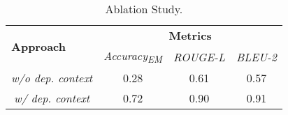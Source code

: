 \begin{table}[]
\centering
\begin{tabular}{l|ccc}
\toprule
\multirow{2}{*}{\textbf{Approach}} & \multicolumn{3}{c}{\textbf{Metrics}}                                  \\ \cline{2-4} 
                                   & \multicolumn{1}{c|}{\textit{Accuracy\textsubscript{EM}}} & \multicolumn{1}{c|}{\textit{ROUGE-L}} & \textit{BLEU-2} \\ \hline
\multicolumn{1}{c|}{\textit{w/o dep. context}}      & \multicolumn{1}{c|}{0.28}         & \multicolumn{1}{c|}{0.61}        &  0.57 \\
\multicolumn{1}{c|}{\textit{w/ dep. context}}       & \multicolumn{1}{c|}{0.72}         & \multicolumn{1}{c|}{0.90}        &  0.91 \\ \bottomrule
\end{tabular}
\caption{Ablation Study.}
\end{table}